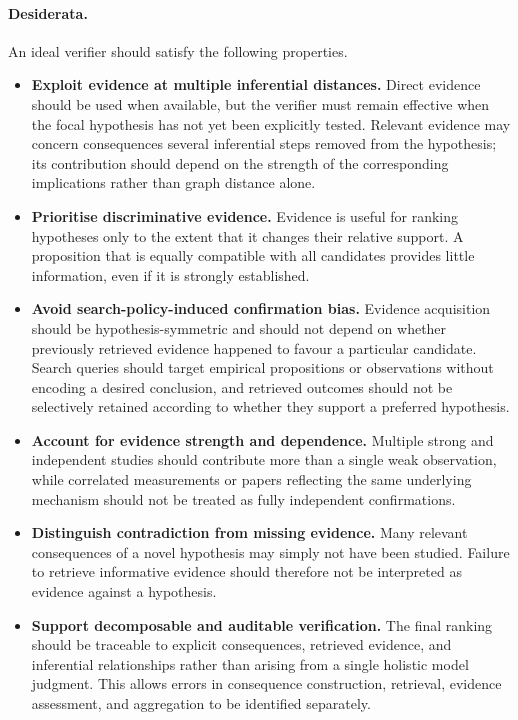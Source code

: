 \documentclass[twoside]{article}
\begin{document}
\paragraph{Desiderata.}
An ideal verifier should satisfy the following properties.
\begin{itemize}[left=0.1cm]
    \item \textbf{Exploit evidence at multiple inferential distances.}
    Direct evidence should be used when available, but the verifier must remain
    effective when the focal hypothesis has not yet been explicitly tested.
    Relevant evidence may concern consequences several inferential steps removed
    from the hypothesis; its contribution should depend on the strength of the
    corresponding implications rather than graph distance alone.

    \item \textbf{Prioritise discriminative evidence.}
    Evidence is useful for ranking hypotheses only to the extent that it changes
    their relative support. A proposition that is equally compatible with all
    candidates provides little information, even if it is strongly established.

    \item \textbf{Avoid search-policy-induced confirmation bias.}
    Evidence acquisition should be hypothesis-symmetric and should not depend on
    whether previously retrieved evidence happened to favour a particular
    candidate. Search queries should target empirical propositions or
    observations without encoding a desired conclusion, and retrieved outcomes
    should not be selectively retained according to whether they support a
    preferred hypothesis.

    \item \textbf{Account for evidence strength and dependence.}
    Multiple strong and independent studies should contribute more than a single
    weak observation, while correlated measurements or papers reflecting the
    same underlying mechanism should not be treated as fully independent
    confirmations.

    \item \textbf{Distinguish contradiction from missing evidence.}
    Many relevant consequences of a novel hypothesis may simply not have been
    studied. Failure to retrieve informative evidence should therefore not be
    interpreted as evidence against a hypothesis.

    \item \textbf{Support decomposable and auditable verification.}
    The final ranking should be traceable to explicit consequences, retrieved
    evidence, and inferential relationships rather than arising from a single
    holistic model judgment. This allows errors in consequence construction,
    retrieval, evidence assessment, and aggregation to be identified
    separately.
\end{itemize}
\end{document}
